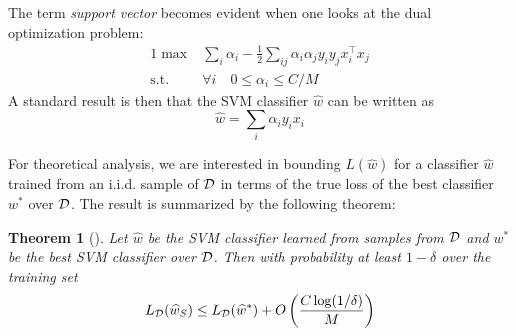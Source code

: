 \documentclass[english]{article}
\theoremstyle{plain}
\newtheorem{theorem}{Theorem}
\begin{document}
The term \emph{support vector} becomes evident when one looks at the dual optimization problem:
\begin{alignat}{1}
\max & \sum_{i}\alpha_{i}-\frac{1}{2}\sum_{ij}\alpha_{i}\alpha_{j}y_{i}y_{j}x_{i}^{\top}x_{j}\\
\text{s.t.} & \forall i\quad0\leq\alpha_{i}\leq C/M
\label{eq:dual_svm}
\end{alignat}
A standard result is then that the SVM classifier $\widehat{w}$ can be written as
\begin{equation}
\widehat{w} = \sum_i \alpha_i y_i x_i
\label{eq:w_dual}
\end{equation}

For theoretical analysis, we are interested in bounding $L(\widehat{w})$ for a classifier $\widehat{w}$ trained from an i.i.d. sample of $\cal D$ in terms of the true loss of the best classifier $w^*$ over $\cal D$.
The result is summarized by the following theorem:
\begin{theorem}[\citet{Sridharan08}]
\label{thm:svm-generalization}
Let $\widehat{w}$ be the SVM classifier learned from samples from $\cal D$ and $w^*$ be the best SVM classifier over $\cal D$. Then with probability at least $1 - \delta$ over the training set
\[
L_{\cal D}(\widehat{w}_S) \leq L_{\cal D}(\widehat{w}^*) + O\left(\frac{C \log (1/\delta)}{M}\right)
\]
\end{theorem}
\end{document}
